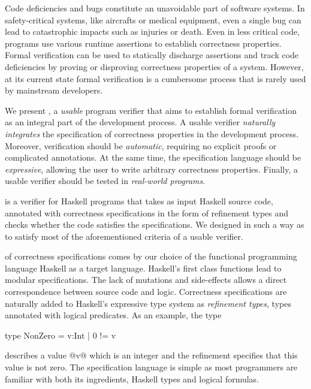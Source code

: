 Code deficiencies and bugs constitute an unavoidable part of software systems.
%
In safety-critical systems, like aircrafts or medical equipment, 
even a single bug can lead to catastrophic impacts
such as injuries or death.
%
Even in less critical code, 
programs use various runtime assertions to establish correctness properties. 
%
Formal verification can be used to statically 
discharge assertions and 
track code deficiencies by proving or disproving correctness properties 
of a system. 
%
However, at its current state formal verification is a cumbersome process
that is rarely used by mainstream developers. 

We present \toolname, a \textit{usable} program verifier that aims to 
establish formal verification as an 
integral part of the development process.
%
A usable verifier \textit{naturally integrates}
the specification of correctness properties
in the development process. 
%
Moreover, verification should be \textit{automatic},
requiring no explicit proofs or complicated annotations. 
%
At the same time, the specification language should be \textit{expressive},
allowing the user to write arbitrary correctness properties. 
%
Finally, a usable verifier should be tested in \textit{real-world programs}. 

\href{http://goto.ucsd.edu/~rjhala/liquid/haskell/blog/about/}{\toolname} is a 
 verifier for Haskell programs
that takes as input Haskell source code, annotated with 
correctness specifications in the form of refinement types and checks whether the code satisfies the specifications. 
%
We designed \toolname in such a way as to satisfy most of the 
aforementioned criteria of a usable verifier.

 of correctness specifications 
comes by our choice of the functional programming language Haskell as a target language.
%
Haskell's first class functions lead to modular specifications. 
The lack of mutations and side-effects allows a direct correspondence between 
source code and logic. 
%
Correctness specifications are naturally added to Haskell's expressive type system
as \textit{refinement types}, \ie types annotated with logical predicates.
As an example, the type 
\begin{code}
  type NonZero = {v:Int | 0 != v}
\end{code}
describes a value @v@ which is an integer 
and the refinement specifies that this value is not zero.
%
The specification language is simple
as most programmers are familiar with both
its ingredients, \ie Haskell types and logical formulas.

